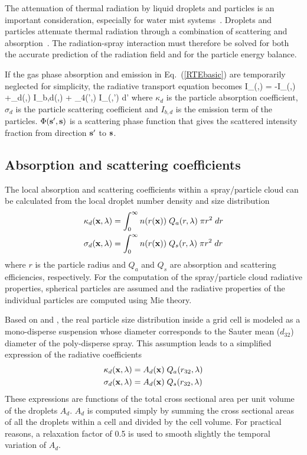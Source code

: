 The attenuation of thermal radiation by liquid droplets and particles is an important consideration, especially for water mist
systems~\cite{Ravigururajan:1}.  Droplets and particles attenuate thermal radiation through a combination of scattering and
absorption~\cite{Tuntomo:1}.  The radiation-spray interaction must therefore be solved for both the accurate prediction of the radiation
field and for the particle energy balance.

If the gas phase absorption and emission in Eq.~(\ref{RTEbasic}) are temporarily neglected for simplicity, the radiative transport
equation becomes
\be \bs \cdot \nabla I_{\la}(\bx,\bs) = -
I_{\la}(\bx,\bs) +\kappa_d(\bx,\la) \; I_{b,d}(\bx,\la) +
\int_{4\pi}\Phi(\bs',\bs) \; I_{\la}(\bx,\bs') \; d\bs'
\label{RTEspray} \ee
where $\kappa_d$ is the particle absorption coefficient, $\sigma_d$ is the
particle scattering coefficient and $I_{b,d}$ is the emission
term of the particles. $\Phi({\bf s}',{\bf s})$ is a scattering phase function
that gives the scattered intensity fraction from direction ${\bf s}'$ to ${\bf s}$.\\

\subsection{Absorption and scattering coefficients}

The local absorption and scattering coefficients within a spray/particle cloud can be calculated
from the local droplet number density and size distribution
\begin{align}
\kappa_d(\bx,\la) &= \int_0^\infty n(r(\bx)) \; Q_a(r,\la) \; \pi r^2 \; dr \\ %
\sigma_d(\bx,\la) &= \int_0^\infty n(r(\bx)) \; Q_s(r,\la) \; \pi r^2 \; dr%
\end{align}
where $r$ is the particle radius and $Q_a$ and $Q_s$ are absorption and
scattering efficiencies, respectively.  For the computation of the spray/particle cloud radiative properties,
spherical particles are assumed and the radiative properties of the individual particles
are computed using Mie theory.

Based on \cite{Collin} and \cite{Maruyama}, the real particle size distribution inside a grid cell is modeled as a mono-disperse suspension
whose diameter corresponds to the Sauter mean ($d_{32}$) diameter of the poly-disperse spray.
This assumption leads to a simplified expression of the radiative coefficients
\begin{align}
\kappa_d({\bf x},\lambda) &= A_d({\bf x}) \; Q_a(r_{32},\lambda) \\
\sigma_d({\bf x},\lambda) &= A_d({\bf x}) \; Q_s(r_{32},\lambda)
\end{align}
These expressions are functions of the total cross sectional area per unit volume of the droplets $A_d$. $A_d$ is computed simply by summing the cross sectional areas of all the droplets within a cell and divided by the cell volume. For practical reasons, a relaxation factor of 0.5 is
used to smooth slightly the temporal variation of $A_d$.

